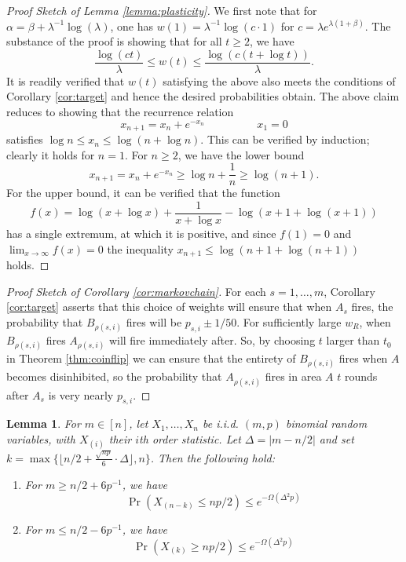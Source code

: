 \documentclass{article}
\newtheorem{lemma}[theorem]{Lemma}
\theoremstyle{remark}
\newcommand{\1}{\mathbbm{1}}
\begin{document}
\begin{proof}[Proof Sketch of Lemma \ref{lemma:plasticity}]
    We first note that for $\alpha = \beta + \lambda^{-1} \log(\lambda)$, one has $w(1) = \lambda^{-1}\log(c \cdot 1)$ for $c = \lambda e^{\lambda(1 + \beta)}$. 
    The substance of the proof is showing that for all $t \ge 2$, we have
    \[\frac{\log (c t)}{\lambda} \le w(t) \le \frac{\log (c(t + \log t))}{\lambda}.\]
    It is readily verified that $w(t)$ satisfying the above also meets the conditions of Corollary \ref{cor:target} and hence the desired probabilities obtain.
    The above claim reduces to showing that the recurrence relation
    \[x_{n+1} = x_n + e^{-x_n} \hspace{2cm} x_1 = 0\]
    satisfies $\log n \le x_n \le \log(n + \log n)$. This can be verified by induction; clearly it holds for $n=1$. For $n \ge 2$, we have the lower bound
    \[x_{n+1} = x_n + e^{-x_n} \ge \log n + \frac{1}{n} \ge \log (n+1).\]
    For the upper bound, it can be verified that the function 
    \[f(x) = \log(x + \log x) + \frac{1}{x + \log x} - \log(x+1 + \log(x+1))\]
    has a single extremum, at which it is positive, and since $f(1) = 0$ and $\lim_{x \to \infty}f(x) = 0$ the inequality $x_{n+1} \le \log(n+1 + \log(n+1))$ holds.
\end{proof}

\begin{proof}[Proof Sketch of Corollary \ref{cor:markovchain}]
    For each $s=1,\ldots,m$, Corollary \ref{cor:target} asserts that this choice of weights will ensure that when $A_s$ fires, the probability that $B_{\rho(s, i)}$ fires will be $p_{s, i} \pm 1/50$. For sufficiently large $w_R$, when $B_{\rho(s, i)}$ fires $A_{\rho(s, i)}$ will fire immediately after. So, by choosing $t$ larger than $t_0$ in Theorem \ref{thm:coinflip} we can ensure that the entirety of $B_{\rho(s, i)}$ fires when $A$ becomes disinhibited, so the probability that $A_{\rho(s, i)}$ fires in area $A$ $t$ rounds after $A_s$ is very nearly $p_{s, i}$.  
\end{proof}

\begin{lemma} \label{lemma:conv-w-advantage}   For $m \in [n]$, let $X_1, \ldots, X_n$ be i.i.d. $(m, p)$ binomial random variables, with $X_{(i)}$ their $i$th order statistic. Let $\Delta = |m - n/2|$ and set $k = \max\{\lfloor n/2 + \frac{\sqrt{np}}{6} \cdot \Delta \rfloor, n\}$. Then the following hold:
    \begin{enumerate}
        \item For $m \ge n /2 + 6p^{-1}$, we have
        \[\Pr(X_{(n-k)} \le np / 2) \le e^{-\Omega(\Delta^2 p)}\]
        \item For $m \le n /2 - 6p^{-1}$, we have
        \[\Pr(X_{(k)} \ge np / 2) \le e^{-\Omega(\Delta^2 p)}\]
    \end{enumerate}    
\end{lemma}
\end{document}
